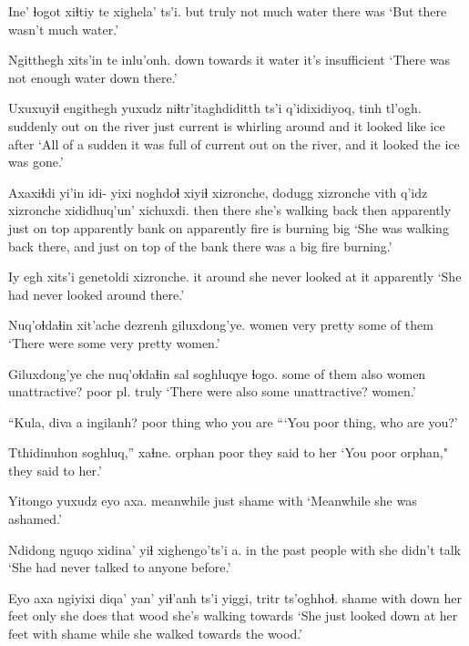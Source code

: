 \documentclass[12pt]{article}
\begin{document}
\gll Ine' ɬogot xiɬtiy     te    xighela' ts'i.
but  truly {not much} water {there was}
\glt `But there wasn't much water.'
\glend

\gll Ngitthegh xits'in    te    inlu'onh.
down      {towards it} water {it's insufficient}
\glt `There was not enough water down there.'
\glend

\gll Uxuxuyiɬ   engithegh         yuxudz  niɬtr'itaghdiditth      ts'i q'idixidiyoq, tinh tl'ogh.
suddenly {out on the river} just  {current is whirling around} and  {it looked like} ice after
\glt `All of a sudden it was full of current out on the river, and it looked the ice was gone.'
\glend

\gll Axaxiɬdi {yi'in idi-} yixi  noghdoɬ xiyiɬ xizronche, dodugg  xizronche vith q'idz xizronche xididhuq'un'    xichuxdi.
then {} there {she's walking back} then apparently {just on top} apparently       bank on    apparently       {fire is burning} big 
\glt `She was walking back there, and just on top of the bank there was a big fire burning.'
\glend

\gll Iy egh {xits'i genetoldi}       xizronche.
it around   {she never looked at it} apparently
\glt `She had never looked around there.'
\glend

\gll Nuq'oɬdaɬin xit'ache dezrenh giluxdong'ye.
women       very     pretty  {some of them}
\glt `There were some very pretty women.'
\glend

\gll Giluxdong'ye che  nuq'oɬdaɬin sal  soghluqye ɬogo.
{some of them}  also women       unattractive? {poor pl.} truly
\glt `There were also some unattractive? women.'
\glend

\gll ``Kula,      diva a ingilanh?
{poor thing} who {} {you are}
\glt ```You poor thing, who are you?'
\glend

\gll Tthidinuhon soghluq,'' xaɬne.
orphan      poor    {they said to her}
\glt `You poor orphan," they said to her.'
\glend

\gll Yitongo  yuxudz eyo   axa.
meanwhile just shame with
\glt `Meanwhile she was ashamed.'
\glend

\gll Ndidong     {nguqo xidina'} yiɬ {xighengo'ts'i} a.
{in the past} people        with {she didn't talk} 
\glt `She had never talked to anyone before.'
\glend

\gll Eyo   axa  ngiyixi diqa'    yan' yiɬ'anh ts'i yiggi, tritr ts'oghhoɬ.
shame with down    {her feet} only {she does} {}  that  wood {she's walking towards}
\glt `She just looked down at her feet with shame while she walked towards the wood.'
\glend
\end{document}

